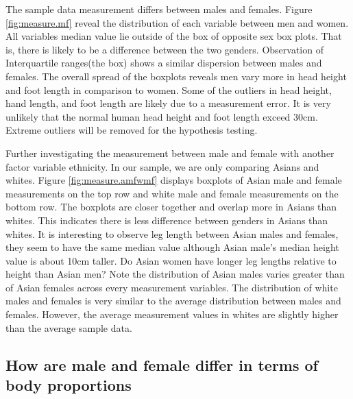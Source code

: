\documentclass[]{article}
\begin{document}
\noindent The sample data measurement differs between males and females.
Figure \ref{fig:measure.mf} reveal the distribution of each variable
between men and women. All variables median value lie outside of the box
of opposite sex box plots. That is, there is likely to be a difference
between the two genders. Observation of Interquartile ranges(the box)
shows a similar dispersion between males and females. The overall spread
of the boxplots reveals men vary more in head height and foot length in
comparison to women. Some of the outliers in head height, hand length,
and foot length are likely due to a measurement error. It is very
unlikely that the normal human head height and foot length exceed 30cm.
Extreme outliers will be removed for the hypothesis
testing.\vspace{0.25in}

\noindent Further investigating the measurement between male and female
with another factor variable ethnicity. In our sample, we are only
comparing Asians and whites. Figure \ref{fig:measure.amfwmf} displays
boxplots of Asian male and female measurements on the top row and white
male and female measurements on the bottom row. The boxplots are closer
together and overlap more in Asians than whites. This indicates there is
less difference between genders in Asians than whites. It is interesting
to observe leg length between Asian males and females, they seem to have
the same median value although Asian male's median height value is about
10cm taller. Do Asian women have longer leg lengths relative to height
than Asian men? Note the distribution of Asian males varies greater than
of Asian females across every measurement variables. The distribution of
white males and females is very similar to the average distribution
between males and females. However, the average measurement values in
whites are slightly higher than the average sample data.\vspace{0.25in}

\subsection{How are male and female differ in terms of body proportions}
\label{sec:rq3}
\end{document}
